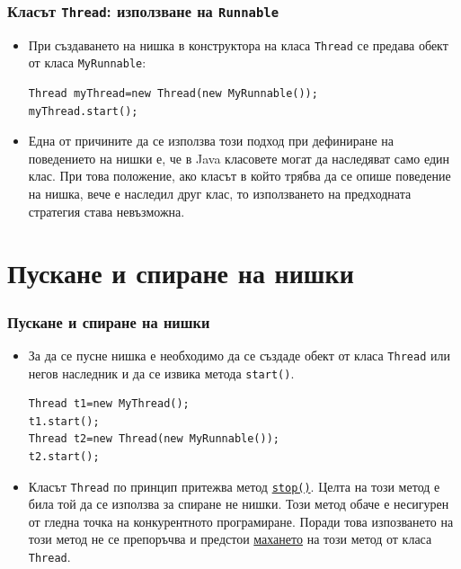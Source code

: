 \documentclass[ignorenonframetext, hyperref=unicode,compress]{beamer}
\begin{document}
\begin{frame}[containsverbatim]
\frametitle{Класът \lstinline{Thread}: използване на \lstinline{Runnable} }
\begin{itemize}
\item При създаването на нишка в конструктора на класа \lstinline{Thread} се
предава обект от класа \lstinline{MyRunnable}:
\begin{lstlisting}
Thread myThread=new Thread(new MyRunnable());
myThread.start();
\end{lstlisting}
\item Една от причините да се използва този подход при дефиниране на
поведението на нишки е, че в Java класовете могат да наследяват само един клас.
При това положение, ако класът в който трябва да се опише поведение на нишка,
вече е наследил друг клас, то използването на предходната стратегия става
невъзможна.
\end{itemize}
\end{frame}

\section{Пускане и спиране на нишки}
\begin{frame}[containsverbatim]
\frametitle{Пускане и спиране на нишки}
\begin{itemize}
\item За да се пусне нишка е необходимо да се създаде обект от класа
\lstinline{Thread} или негов наследник и да се извика метода
\lstinline{start()}.
\begin{lstlisting}
Thread t1=new MyThread();
t1.start();
Thread t2=new Thread(new MyRunnable());
t2.start();
\end{lstlisting}
\item Класът \lstinline{Thread} по принцип притежва метод
\href{http://java.sun.com/javase/6/docs/api/java/lang/Thread.html#stop()}{\lstinline{stop()}}.
Целта на този метод е била той да се използва за спиране не нишки. Този метод
обаче е несигурен от гледна точка на конкурентното програмиране. Поради това
изпозването на този метод не се препоръчва и предстои 
\href{http://java.sun.com/javase/6/docs/technotes/guides/concurrency/threadPrimitiveDeprecation.html}{махането}
на този метод от класа \lstinline{Thread}.
\end{itemize}
\end{frame}
\end{document}

